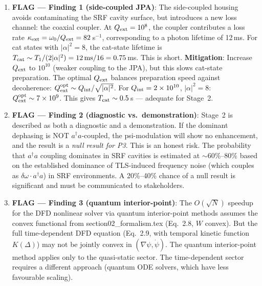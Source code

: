 \documentclass[11pt]{article}
\theoremstyle{definition}
\theoremstyle{remark}
\newcommand{\ee}[1]{\times 10^{#1}}
\begin{document}
\begin{tcolorbox}[colback=red!5!white, colframe=red!60!black,
  title=\textbf{INCONSISTENCIES AND FLAGS}]
\begin{enumerate}[nosep]

\item \textbf{FLAG --- Finding 1 (side-coupled JPA)}: The side-coupled
  housing avoids contaminating the SRF cavity surface, but introduces
  a new loss channel: the coaxial coupler.  At $Q_{\rm ext} = 10^8$,
  the coupler contributes a loss rate $\kappa_{\rm ext} = \omega_0 /
  Q_{\rm ext} = 82$\,s$^{-1}$, corresponding to a photon lifetime of
  12\,ms.  For cat states with $|\alpha|^2 = 8$, the cat-state lifetime
  is $T_{\rm cat} \sim T_1 / (2|\alpha|^2) = 12\,\text{ms}/16 =
  0.75$\,ms.  This is short.  \textbf{Mitigation}: Increase $Q_{\rm ext}$
  to $10^{10}$ (weaker coupling to the JPA), but this slows cat-state
  preparation.  The optimal $Q_{\rm ext}$ balances preparation speed
  against decoherence: $Q_{\rm ext}^{\rm opt} \sim Q_{\rm int}/
  \sqrt{|\alpha|^2}$.  For $Q_{\rm int} = 2\ee{10}$, $|\alpha|^2 = 8$:
  $Q_{\rm ext}^{\rm opt} \sim 7\ee{9}$.  This gives $T_{\rm cat}
  \sim 0.5$\,s --- adequate for Stage~2.

\item \textbf{FLAG --- Finding 2 (diagnostic vs.\ demonstration)}:
  Stage~2 is described as both a diagnostic and a demonstration.
  If the dominant dephasing is NOT $a^\dagger a$-coupled, the
  psi-modulation will show no enhancement, and the result is a
  \emph{null result for P3}.  This is an honest risk.  The
  probability that $a^\dagger a$ coupling dominates in SRF cavities
  is estimated at $\sim 60\%$--$80\%$ based on the established
  dominance of TLS-induced frequency noise (which couples as
  $\delta\omega \cdot a^\dagger a$) in SRF environments.  A 20\%--40\%
  chance of a null result is significant and must be communicated
  to stakeholders.

\item \textbf{FLAG --- Finding 3 (quantum interior-point)}: The
  $O(\sqrt{N})$ speedup for the DFD nonlinear solver via quantum
  interior-point methods assumes the convex functional from
  section02\_formalism.tex (Eq.~2.8, $W$ convex).  But the
  full time-dependent DFD equation (Eq.~2.9, with temporal kinetic
  function $K(\Delta)$) may not be jointly convex in $(\nabla\psi,
  \dot\psi)$.  The quantum interior-point method applies only to the
  quasi-static sector.  The time-dependent sector requires a different
  approach (quantum ODE solvers, which have less favourable scaling).


\end{enumerate}
\end{tcolorbox}
\end{document}
